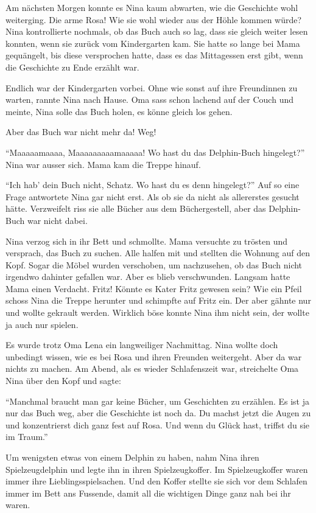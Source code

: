 Am nächsten Morgen konnte es Nina kaum abwarten, wie die Geschichte wohl weiterging. Die arme Rosa! Wie sie wohl wieder aus der Höhle kommen würde? Nina kontrollierte nochmals, ob das Buch auch so lag, dass sie gleich weiter lesen konnten, wenn sie zurück vom Kindergarten kam. Sie hatte so lange bei Mama gequängelt, bis diese versprochen hatte, dass es das Mittagessen erst gibt, wenn die Geschichte zu Ende erzählt war.

Endlich war der Kindergarten vorbei. Ohne wie sonst auf ihre Freundinnen zu warten, rannte Nina nach Hause. Oma sass schon lachend auf der Couch und meinte, Nina solle das Buch holen, es könne gleich los gehen.

Aber das Buch war nicht mehr da! Weg!

\enquote{Maaaaamaaaa, Maaaaaaaaamaaaaa! Wo hast du das Delphin-Buch hingelegt?} Nina war ausser sich. Mama kam die Treppe hinauf.

\enquote{Ich hab' dein Buch nicht, Schatz. Wo hast du es denn hingelegt?} Auf so eine Frage antwortete Nina gar nicht erst. Als ob sie da nicht als allererstes gesucht hätte. Verzweifelt riss sie alle Bücher aus dem Büchergestell, aber das Delphin-Buch war nicht dabei.

Nina verzog sich in ihr Bett und schmollte. Mama versuchte zu trösten und versprach, das Buch zu suchen. Alle halfen mit und stellten die Wohnung auf den Kopf. Sogar die Möbel wurden verschoben, um nachzusehen, ob das Buch nicht irgendwo dahinter gefallen war. Aber es blieb verschwunden.  Langsam hatte Mama einen Verdacht. Fritz! Könnte es Kater Fritz gewesen sein? Wie ein Pfeil schoss Nina die Treppe herunter und schimpfte auf Fritz ein. Der aber gähnte nur und wollte gekrault werden. Wirklich böse konnte Nina ihm nicht sein, der wollte ja auch nur spielen.

Es wurde trotz Oma Lena ein langweiliger Nachmittag. Nina wollte doch unbedingt wissen, wie es bei Rosa und ihren Freunden weitergeht. Aber da war nichts zu machen. Am Abend, als es wieder Schlafenszeit war, streichelte Oma Nina über den Kopf und sagte:

\enquote{Manchmal braucht man gar keine Bücher, um Geschichten zu erzählen. Es ist ja nur das Buch weg, aber die Geschichte ist noch da. Du machst jetzt die Augen zu und konzentrierst dich ganz fest auf Rosa. Und wenn du Glück hast, triffst du sie im Traum.}

Um wenigsten etwas von einem Delphin zu haben, nahm Nina ihren Spielzeugdelphin und legte ihn in ihren Spielzeugkoffer. Im Spielzeugkoffer waren immer ihre Lieblingsspielsachen. Und den Koffer stellte sie sich vor dem Schlafen immer im Bett ans Fussende, damit all die wichtigen Dinge ganz nah bei ihr waren.


